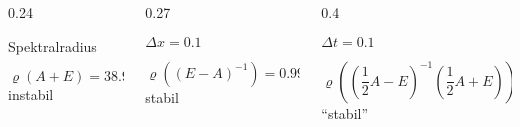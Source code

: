 \begin{frame}
\begin{columns}[t]
\begin{column}{0.24\hsize}
\begin{block}{Spektralradius\strut}
\vspace{-15pt}
\[
\varrho(A+E) = 38.990
\]
instabil
\end{block}
\end{column}
\begin{column}{0.27\hsize}
\begin{block}{$\Delta x = 0.1$\strut}
\vspace{-15pt}
\[
\varrho((E-A)^{-1}) = 0.99528
\]
stabil
\end{block}
\end{column}
\begin{column}{0.4\hsize}
\begin{block}{$\Delta t=0.1$\strut}
\vspace{-15pt}
\[
\varrho(
({\textstyle\frac12}A-E)^{-1}
({\textstyle\frac12}A+E)
)
=
1
\]
``stabil''
\end{block}
\end{column}
\end{columns}

\end{frame}
